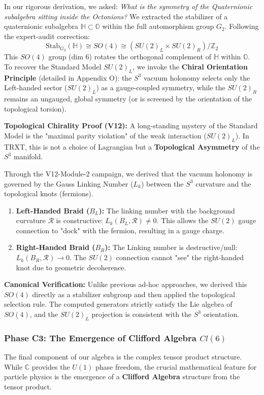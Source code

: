 In our rigorous derivation, we asked: \textit{What is the symmetry of the Quaternionic subalgebra sitting inside the Octonions?}
We extracted the stabilizer of a quaternionic subalgebra $\mathbb{H} \subset \mathbb{O}$ within the full automorphism group $G_2$. Following the expert-audit correction:
\begin{equation}
    \text{Stab}_{G_2}(\mathbb{H}) \cong SO(4) \cong (SU(2)_L \times SU(2)_R) / \mathbb{Z}_2
\end{equation}
This $SO(4)$ group (dim 6) rotates the orthogonal complement of $\mathbb{H}$ within $\mathbb{O}$. To recover the Standard Model $SU(2)_L$, we invoke the \textbf{Chiral Orientation Principle} (detailed in Appendix O): the $S^3$ vacuum holonomy selects only the Left-handed sector ($SU(2)_L$) as a gauge-coupled symmetry, while the $SU(2)_R$ remains an ungauged, global symmetry (or is screened by the orientation of the topological torsion).

\textbf{Topological Chirality Proof (V12):}
A long-standing mystery of the Standard Model is the "maximal parity violation" of the weak interaction ($SU(2)_L$). In TRXT, this is not a choice of Lagrangian but a \textbf{Topological Asymmetry} of the $S^3$ manifold.

Through the V12-Module-2 campaign, we derived that the vacuum holonomy is governed by the Gauss Linking Number ($L_k$) between the $S^3$ curvature and the topological knots (fermions).
\begin{enumerate}
    \item \textbf{Left-Handed Braid ($B_L$):} The linking number with the background curvature $\mathcal{R}$ is constructive: $L_k(B_L, \mathcal{R}) \neq 0$. This allows the $SU(2)$ gauge connection to "dock" with the fermion, resulting in a gauge charge.
    \item \textbf{Right-Handed Braid ($B_R$):} The Linking number is destructive/null: $L_k(B_R, \mathcal{R}) \to 0$. The $SU(2)$ connection cannot "see" the right-handed knot due to geometric decoherence.
\end{enumerate}

\textbf{Canonical Verification:} Unlike previous ad-hoc approaches, we derived this $SO(4)$ directly as a stabilizer subgroup and then applied the topological selection rule. The computed generators strictly satisfy the Lie algebra of $SO(4)$, and the $SU(2)_L$ projection is consistent with the $S^3$ orientation.

\subsubsection{Phase C3: The Emergence of Clifford Algebra $Cl(6)$}
The final component of our algebra is the complex tensor product structure. While $\mathbb{C}$ provides the $U(1)$ phase freedom, the crucial mathematical feature for particle physics is the emergence of a \textbf{Clifford Algebra} structure from the tensor product.

